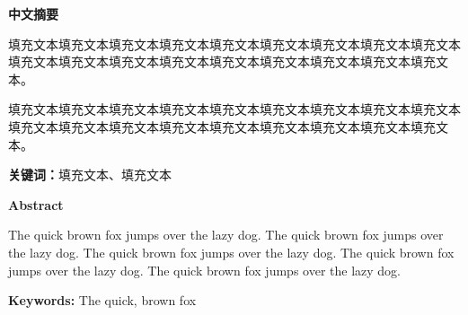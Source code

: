\thispagestyle{plain}
\centerline{\Large \bf 中文摘要}

\vspace{0.5cm}
填充文本填充文本填充文本填充文本填充文本填充文本填充文本填充文本填充文本填充文本填充文本填充文本填充文本填充文本填充文本填充文本填充文本填充文本。

填充文本填充文本填充文本填充文本填充文本填充文本填充文本填充文本填充文本填充文本填充文本填充文本填充文本填充文本填充文本填充文本填充文本填充文本。

\vspace{0.5cm}
{\noindent \bf 关键词：}填充文本、填充文本

\newpage
\thispagestyle{plain}
\centerline{\Large \bf Abstract}

\vspace{0.5cm}
The quick brown fox jumps over the lazy dog. The quick brown fox jumps over the lazy dog. The quick brown fox jumps over the lazy dog. The quick brown fox jumps over the lazy dog. The quick brown fox jumps over the lazy dog. 


\vspace{0.5cm}
{\noindent \bf Keywords:} The quick, brown fox
\newpage
